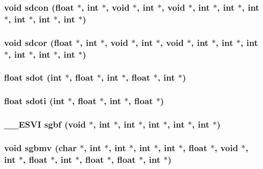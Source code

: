 \subsubsection{\setlength{\rightskip}{0pt plus 5cm}void sdcon (float $\ast$, int $\ast$, void $\ast$, int $\ast$, void $\ast$, int $\ast$, int $\ast$, int $\ast$, int $\ast$, int $\ast$, int $\ast$)}\label{essl_8h_effaf2d969d35242f877d8de57e32ff6}


\subsubsection{\setlength{\rightskip}{0pt plus 5cm}void sdcor (float $\ast$, int $\ast$, void $\ast$, int $\ast$, void $\ast$, int $\ast$, int $\ast$, int $\ast$, int $\ast$, int $\ast$, int $\ast$)}\label{essl_8h_9e82d687c65e57c196874067f7bc3527}


\subsubsection{\setlength{\rightskip}{0pt plus 5cm}float sdot (int $\ast$, float $\ast$, int $\ast$, float $\ast$, int $\ast$)}\label{essl_8h_a38a7eae66abc8dcf97b69f3d8e00d70}


\subsubsection{\setlength{\rightskip}{0pt plus 5cm}float sdoti (int $\ast$, float $\ast$, int $\ast$, float $\ast$)}\label{essl_8h_5265a789c11d1e2dfe93ac034f07e9da}


\subsubsection{\setlength{\rightskip}{0pt plus 5cm}\_\-\_\-ESVI sgbf (void $\ast$, int $\ast$, int $\ast$, int $\ast$, int $\ast$, int $\ast$)}\label{essl_8h_8141585790b3f5a97dbe871510cf0314}


\subsubsection{\setlength{\rightskip}{0pt plus 5cm}void sgbmv (char $\ast$, int $\ast$, int $\ast$, int $\ast$, int $\ast$, float $\ast$, void $\ast$, int $\ast$, float $\ast$, int $\ast$, float $\ast$, float $\ast$, int $\ast$)}\label{essl_8h_97ecb22f0801eb020ba79cd497ed32cc}


